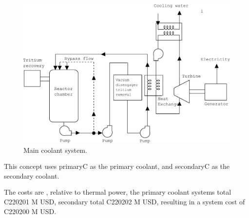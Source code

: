 \begin{figure}[h!]  
\centering  
\includegraphics[width=0.8\linewidth]{StandardFigures/steamPbLi-eps-converted-to.pdf}
\caption{Main coolant system.}
\label{fig:coola}
\end{figure} 

This concept uses primaryC as the primary coolant, and secondaryC as the secondary coolant. 

The costs are , relative to thermal power, the primary coolant systems total C220201 M USD, secondary total C220202 M USD, resulting in a system cost of C220200 M USD. 